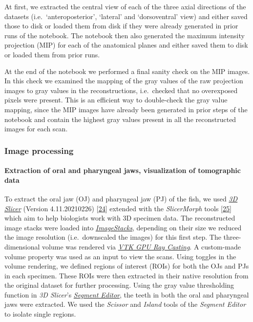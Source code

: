 At first, we extracted the central view of each of the three axial directions of the datasets (i.e.~`anteroposterior', `lateral' and `dorsoventral' view) and either saved those to disk or loaded them from disk if they were already generated in prior runs of the notebook.
The notebook then also generated the maximum intensity projection (MIP) for each of the anatomical planes and either saved them to disk or loaded them from prior runs.

At the end of the notebook we performed a final sanity check on the MIP images.
In this check we examined the mapping of the gray values of the raw projection images to gray values in the reconstructions, i.e.~checked that no overexposed pixels were present.
This is an efficient way to double-check the gray value mapping, since the MIP images have already been generated in prior steps of the notebook and contain the highest gray values present in all the reconstructed images for each scan.

\hypertarget{image-processing}{%
\subsubsection{Image processing}\label{image-processing}}

\hypertarget{extraction-of-oral-and-pharyngeal-jaws-visualization-of-tomographic-data}{%
\paragraph{Extraction of oral and pharyngeal jaws, visualization of tomographic data}\label{extraction-of-oral-and-pharyngeal-jaws-visualization-of-tomographic-data}}

To extract the oral jaw (OJ) and pharyngeal jaw (PJ) of the fish, we used \href{https://www.slicer.org}{\emph{3D Slicer}} (Version 4.11.20210226) {[}\protect\hyperlink{ref-OsCpHsJH}{24}{]} extended with the \emph{SlicerMorph} tools {[}\protect\hyperlink{ref-MwdN6kPV}{25}{]} which aim to help biologists work with 3D specimen data.
The reconstructed image stacks were loaded into \href{https://www.slicer.org/wiki/Documentation/Labs/ImageStacks}{\emph{ImageStacks}}, depending on their size we reduced the image resolution (i.e.~downscaled the images) for this first step.
The three-dimensional volume was rendered via \href{https://slicer.readthedocs.io/en/latest/user_guide/modules/volumerendering.html}{\emph{VTK GPU Ray Casting}}.
A custom-made volume property was used as an input to view the scans.
Using toggles in the volume rendering, we defined regions of interest (ROIs) for both the OJs and PJs in each specimen.
These ROIs were then extracted in their native resolution from the original dataset for further processing.
Using the gray value thresholding function in \emph{3D Slicer}'s \href{https://slicer.readthedocs.io/en/latest/user_guide/modules/segmenteditor.html}{\emph{Segment Editor}}, the teeth in both the oral and pharyngeal jaws were extracted.
We used the \emph{Scissor} and \emph{Island} tools of the \emph{Segment Editor} to isolate single regions.

